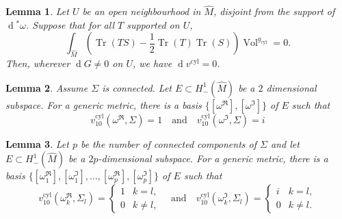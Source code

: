 \documentclass[10pt,a4paper]{amsart}
\newtheorem{lemma}{Lemma}
\newcommand{\Tr}{\operatorname{Tr}}
\newcommand{\Vol}{\operatorname{Vol}}
\renewcommand{\d}{\operatorname{d}\!}
\begin{document}
\begin{lemma}
	\label{lem:variation:lemma2.2-he}
	Let $U$ be an open neighbourhood in $\hat{M}$, disjoint from the support of $\d^* \omega$. Suppose that for all $T$ supported on $U$,
	\begin{equation}
		\label{eq:variation:lemma2.2-he}
		  \int_{\hat{M}} (\Tr(TS) - \frac{1}{2}\Tr(T)\Tr(S))\Vol^{g_{\mathrm{cyl}}} = 0.
	\end{equation}
	Then, wherever $\d G \not= 0$ on $U$, we have $\d v^{\mathrm{cyl}} = 0$.
\end{lemma}

\begin{lemma}
	\label{lem:proof-assumptions-connected-case}
	Assume $\Sigma$ is connected.
	Let $E \subset H^1_-(\hat{M})$ be a $2$ dimensional subspace. For a generic metric, there is a basis $\{ [\omega^\Re], [\omega^\Im]\}$ of $E$ such that 
	$$
	v^{\mathrm{cyl}}_{10}(\omega^\Re, \Sigma) = 1
	\quad \text{and} \quad
	v^{\mathrm{cyl}}_{10}(\omega^\Im, \Sigma) = i
	$$
\end{lemma}

\begin{lemma}
	\label{lem:proof-assumptions-non-connected-case}
	Let $p$ be the number of connected components of $\Sigma$ and let $E \subset H^1_-(\hat{M})$ be a $2p$-dimensional subspace. For a generic metric, there is a basis $\{ [\omega_1^\Re], [\omega_1^\Im], \ldots, [\omega_p^\Re], [\omega_p^\Im]\}$ of $E$ such that 
	$$
	v^{\mathrm{cyl}}_{10}(\omega_k^\Re, \Sigma_l) = \begin{cases}
		1 & k = l, \\
		0 & k \not= l,
	\end{cases}
	\quad \text{and} \quad
	v^{\mathrm{cyl}}_{10}(\omega_k^\Im, \Sigma_l) = \begin{cases}
		i & k = l, \\
		0 & k \not= l.
	\end{cases}
	$$
\end{lemma}
\end{document}
